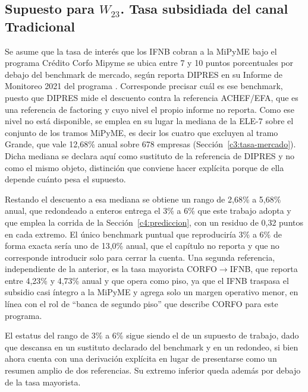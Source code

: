 \subsection[Supuesto para W23. Tasa subsidiada del canal Tradicional]{Supuesto para $W_{23}$. Tasa subsidiada del canal Tradicional}
\label{c3:supuesto-w23}

Se asume que la tasa de interés que los IFNB cobran a la MiPyME bajo el programa Crédito Corfo Mipyme se ubica entre 7 y 10 puntos porcentuales por debajo del benchmark de mercado, según reporta DIPRES en su Informe de Monitoreo 2021 del programa \cite{dipres_monitoreo_2021}. Corresponde precisar cuál es ese benchmark, puesto que DIPRES mide el descuento contra la referencia ACHEF/EFA, que es una referencia de factoring y cuyo nivel el propio informe no reporta. Como ese nivel no está disponible, se emplea en su lugar la mediana de la ELE-7 sobre el conjunto de los tramos MiPyME, es decir los cuatro que excluyen al tramo Grande, que vale 12,68\% anual sobre 678 empresas (Sección~\ref{c3:tasa-mercado}). Dicha mediana se declara aquí como sustituto de la referencia de DIPRES y no como el mismo objeto, distinción que conviene hacer explícita porque de ella depende cuánto pesa el supuesto.

Restando el descuento a esa mediana se obtiene un rango de 2,68\% a 5,68\% anual, que redondeado a enteros entrega el 3\% a 6\% que este trabajo adopta y que emplea la corrida de la Sección~\ref{c4:prediccion}, con un residuo de 0,32 puntos en cada extremo. El único benchmark puntual que reproduciría 3\% a 6\% de forma exacta sería uno de 13,0\% anual, que el capítulo no reporta y que no corresponde introducir solo para cerrar la cuenta. Una segunda referencia, independiente de la anterior, es la tasa mayorista CORFO$\to$IFNB, que  reporta entre 4,23\% y 4,73\% anual y que opera como piso, ya que el IFNB traspasa el subsidio casi íntegro a la MiPyME y agrega solo un margen operativo menor, en línea con el rol de ``banca de segundo piso'' que describe CORFO para este programa.

El estatus del rango de 3\% a 6\% sigue siendo el de un supuesto de trabajo, dado que descansa en un sustituto declarado del benchmark y en un redondeo, si bien ahora cuenta con una derivación explícita en lugar de presentarse como un resumen amplio de dos referencias. Su extremo inferior queda además por debajo de la tasa mayorista.

